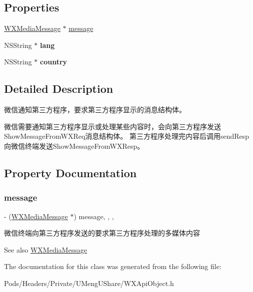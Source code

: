 \subsection*{Properties}
\begin{DoxyCompactItemize}
\item 
\mbox{\hyperlink{interface_w_x_media_message}{W\+X\+Media\+Message}} $\ast$ \mbox{\hyperlink{interface_show_message_from_w_x_req_acd89ff794af84f08fcd3ff841ac02e49}{message}}
\item 
\mbox{\label{interface_show_message_from_w_x_req_aa4b7ff9fdb27dccce42a4d5f30541828}} 
N\+S\+String $\ast$ {\bfseries lang}
\item 
\mbox{\label{interface_show_message_from_w_x_req_a039f61efe0d41c0be0cae76962ab8185}} 
N\+S\+String $\ast$ {\bfseries country}
\end{DoxyCompactItemize}


\subsection{Detailed Description}
微信通知第三方程序，要求第三方程序显示的消息结构体。 

微信需要通知第三方程序显示或处理某些内容时，会向第三方程序发送\+Show\+Message\+From\+W\+X\+Req消息结构体。 第三方程序处理完内容后调用send\+Resp向微信终端发送\+Show\+Message\+From\+W\+X\+Resp。 

\subsection{Property Documentation}
\mbox{\label{interface_show_message_from_w_x_req_acd89ff794af84f08fcd3ff841ac02e49}} 
\subsubsection{\texorpdfstring{message}{message}}
{\footnotesize\ttfamily -\/ (\mbox{\hyperlink{interface_w_x_media_message}{W\+X\+Media\+Message}} $\ast$) message\hspace{0.3cm}{\ttfamily [read]}, {\ttfamily [write]}, {\ttfamily [nonatomic]}, {\ttfamily [retain]}}

微信终端向第三方程序发送的要求第三方程序处理的多媒体内容 \begin{DoxySeeAlso}{See also}
\mbox{\hyperlink{interface_w_x_media_message}{W\+X\+Media\+Message}} 
\end{DoxySeeAlso}


The documentation for this class was generated from the following file\+:\begin{DoxyCompactItemize}
\item 
Pods/\+Headers/\+Private/\+U\+Meng\+U\+Share/W\+X\+Api\+Object.\+h\end{DoxyCompactItemize}
